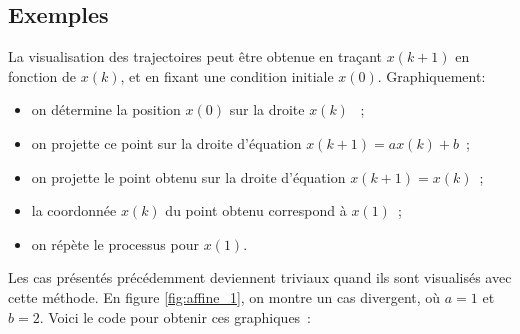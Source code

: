         \subsection{Exemples}
            La visualisation des trajectoires peut être obtenue en traçant $x(k+1)$ en fonction de $x(k)$, et en fixant une condition initiale $x(0)$. Graphiquement:
            \begin{itemize}
                \item on détermine la position $x(0)$ sur la droite $x(k)$ ~;
                \item on projette ce point sur la droite d'équation $x(k+1) = ax(k)+b$~;
                \item on projette le point obtenu sur la droite d'équation $x(k+1)=x(k)$~;
                \item la coordonnée $x(k)$ du point obtenu correspond à $x(1)$~;
                \item on répète le processus pour $x(1)$.
            \end{itemize}
            Les cas présentés précédemment deviennent triviaux quand ils sont visualisés avec cette méthode. En figure \ref{fig:affine_1}, on montre un cas divergent, où $a=1$ et $b=2$.
            Voici le code pour obtenir ces graphiques~:
            \inputminted{python}{codes/affine_un_pas.py}
            
